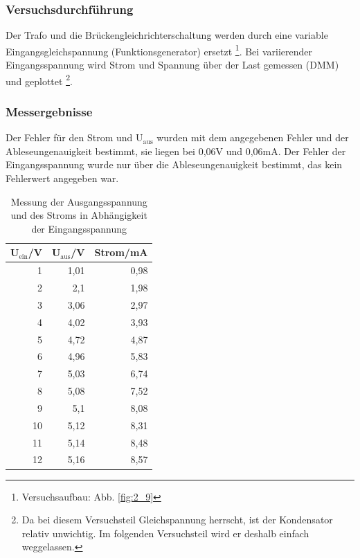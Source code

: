 \documentclass[12pt,a4paper]{article}
\begin{document}
\subsubsection{Versuchsdurchführung}
Der Trafo und die Brückengleichrichterschaltung werden durch eine variable Eingangsgleichspannung (Funktionsgenerator) ersetzt \footnote{Versuchsaufbau: Abb. \ref{fig:2_9}}. Bei variierender Eingangsspannung wird Strom und Spannung über der Last gemessen (DMM) und geplottet \footnote{Da bei diesem Versuchsteil Gleichspannung herrscht, ist der Kondensator relativ unwichtig. Im folgenden Versuchsteil wird er deshalb einfach weggelassen.}.
\subsubsection{Messergebnisse}

Der Fehler für den Strom und U$_\text{aus}$ wurden mit dem angegebenen Fehler und der Ableseungenauigkeit bestimmt, sie liegen bei 0,06V und 0,06mA. Der Fehler der Eingangsspannung wurde nur über die Ableseungenauigkeit bestimmt, das kein Fehlerwert angegeben war.

\begin{table}[H]
\caption{Messung der Ausgangsspannung und des Stroms in Abhängigkeit der Eingangsspannung}
\begin{center}
\begin{tabular}{|r|r|r|}
\hline
\multicolumn{1}{|l|}{U$_\text{ein}$/V} & \multicolumn{1}{l|}{U$_\text{aus}$/V} & \multicolumn{1}{l|}{Strom/mA} \\ \hline
1 & 1,01 & 0,98 \\ \hline
2 & 2,1 & 1,98 \\ \hline
3 & 3,06 & 2,97 \\ \hline
4 & 4,02 & 3,93 \\ \hline
5 & 4,72 & 4,87 \\ \hline
6 & 4,96 & 5,83 \\ \hline
7 & 5,03 & 6,74 \\ \hline
8 & 5,08 & 7,52 \\ \hline
9 & 5,1 & 8,08 \\ \hline
10 & 5,12 & 8,31 \\ \hline
11 & 5,14 & 8,48 \\ \hline
12 & 5,16 & 8,57 \\ \hline
\end{tabular}
\end{center}
\label{tab:3_2_w}
\end{table}
\end{document}
